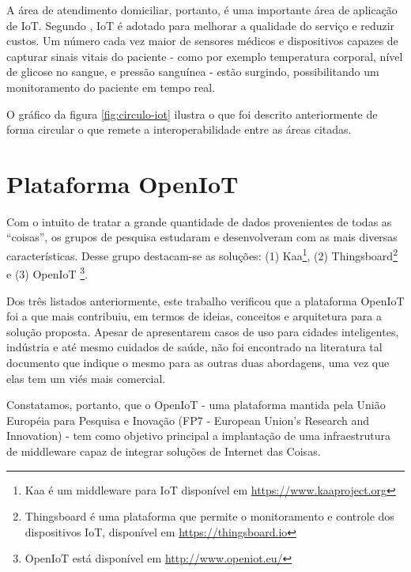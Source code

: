 
A área de atendimento domiciliar, portanto, é uma importante área de aplicação de IoT.
Segundo , IoT é adotado para melhorar a qualidade
do serviço e reduzir custos. Um número cada vez maior de sensores médicos e
dispositivos capazes de capturar sinais vitais do paciente  - como por exemplo
temperatura corporal, nível de glicose no sangue, e pressão sanguínea - estão
surgindo, possibilitando um monitoramento do paciente em tempo real.

O gráfico da figura \ref{fig:circulo-iot} ilustra o que foi descrito
anteriormente de forma circular o que remete a interoperabilidade entre as
áreas citadas.


\section{Plataforma OpenIoT}\label{sec:openiot}

Com o intuito de tratar a grande quantidade de dados provenientes de todas as
``coisas'', os grupos de pesquisa estudaram e desenvolveram \middlewares[] com as
mais diversas características. Desse grupo destacam-se as soluções: (1) Kaa\footnote{Kaa é um
middleware para IoT disponível em \url{https://www.kaaproject.org}},
(2) Thingsboard\footnote{Thingsboard é uma plataforma que permite o monitoramento 
e controle dos dispositivos IoT, disponível em \url{https://thingsboard.io}} e (3) OpenIoT
\footnote{OpenIoT está disponível em \url{http://www.openiot.eu/}}.

Dos três listados anteriormente, este trabalho verificou que a plataforma
OpenIoT foi a que mais contribuiu, em termos de ideias, conceitos e arquitetura
para a solução proposta. Apesar de apresentarem casos de uso para cidades
inteligentes, indústria e até mesmo cuidados de saúde, não foi encontrado na
literatura tal documento que indique o mesmo para as outras duas abordagens,
uma vez que elas tem um viés mais comercial.

Constatamos, portanto, que o OpenIoT - uma plataforma mantida pela União
Européia para Pesquisa e Inovação (FP7 - European Union's Research and
Innovation) - tem como objetivo principal a implantação de uma infraestrutura
de middleware capaz de integrar soluções de Internet das Coisas.

